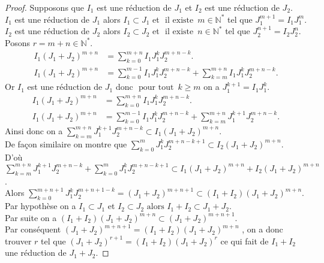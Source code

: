 \begin{proof}
	Supposons que $I_1$ est une réduction de $J_1$ et $I_2$ est une réduction de $J_2$.\\
	$I_1$ est une réduction de $J_1$ alors $I_1 \subset J_1$ et $\text{ il existe } \, m \in \mathbb{N^*}$ tel que $J_1^{m+1} = I_1 J_1^m$.\\
	$I_2$ est une réduction de $J_2$ alors $I_2 \subset J_2$ et $\text{ il existe } \, n \in \mathbb{N^*}$ tel que $J_2^{n+1} = I_2 J_2^n$.\\
	Posons $r=m+n \in \mathbb{N^*} $.\\
	\begin{align*}
		I_1(J_1+J_2)^{m+n}& = \displaystyle \sum_{k=0}^{m+n}{I_1 J_1^k J_2^{m+n-k}}.\\
		I_1(J_1+J_2)^{m+n}& = \displaystyle \sum_{k=0}^{m-1}{I_1 J_1^k J_2^{m+n-k}} + \displaystyle \sum_{k=m}^{m+n}{I_1 J_1^k J_2^{m+n-k}}.
	\end{align*}
	Or $I_1$ est une réduction de $J_1$ donc $\text{ pour tout } \, k\geq m$ on a $J_1^{k+1} = I_1 J_1^{k}.$
	\begin{align*}
		I_1(J_1+J_2)^{m+n}& = \displaystyle \sum_{k=0}^{m+n}{I_1 J_1^k J_2^{m+n-k}}.\\
		I_1(J_1+J_2)^{m+n}& = \displaystyle \sum_{k=0}^{m-1}{I_1 J_1^k J_2^{m+n-k}} + \displaystyle \sum_{k=m}^{m+n}{J_1^{k+1} J_2^{m+n-k}}.
	\end{align*}
	Ainsi donc on a $\displaystyle \sum_{k=m}^{m+n}{J_1^{k+1} J_2^{m+n-k}} \subset  I_1(J_1+J_2)^{m+n}$.\\
	De façon similaire on montre que $\displaystyle \sum_{k=0}^{m}{J_1^{k} J_2^{m+n-k+1}} \subset  I_2(J_1+J_2)^{m+n}.$\\
	D'où $\displaystyle \sum_{k=m}^{m+n}{J_1^{k+1} J_2^{m+n-k}} + \displaystyle \sum_{k=0}^{m}{J_1^{k} J_2^{m+n-k+1}} \subset I_1(J_1+J_2)^{m+n} + I_2(J_1+J_2)^{m+n}$.\\ Alors $\displaystyle \sum_{k=0}^{m+n+1}{J_1^{k} J_2^{m+n+1-k}} = (J_1+J_2)^{m+n+1} \subset (I_1+I_2)(J_1+J_2)^{m+n}$.\\
	Par hypothèse on a $I_1 \subset J_1$ et $I_2 \subset J_2 \text{ alors } I_1+I_2 \subset J_1+J_2$.\\
	Par suite on a $(I_1+I_2)(J_1+J_2)^{m+n} \subset (J_1+J_2)^{m+n+1}$.\\ Par conséquent $(J_1+J_2)^{m+n+1} = (I_1+I_2)(J_1+J_2)^{m+n}$ , on a donc trouver $r$ tel que $(J_1+J_2)^{r+1} = (I_1+I_2)(J_1+J_2)^{r}$ ce qui fait de $I_1+I_2$  une réduction de $J_1+J_2$.
\end{proof}
